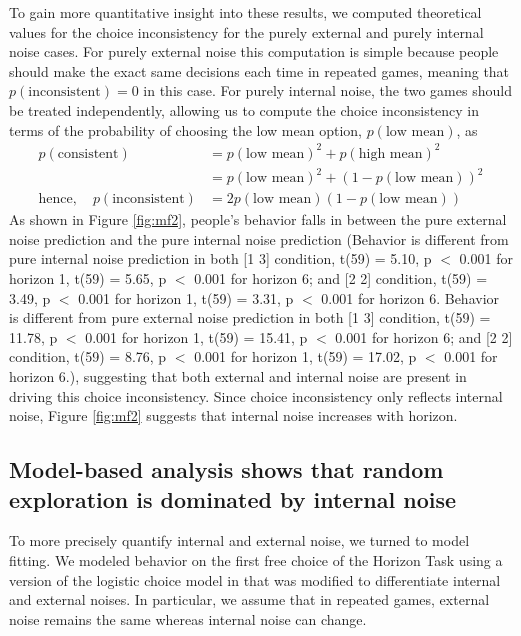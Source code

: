 \documentclass[12pt]{article}
\begin{document}
	To gain more quantitative insight into these results, we computed theoretical values for the choice inconsistency for the purely external and purely internal noise cases.  For purely external noise this computation is simple because people should make the exact same decisions each time in repeated games, meaning that $p(\mbox{inconsistent}) = 0$ in this case. For purely internal noise, the two games should be treated independently, allowing us to compute the choice inconsistency in terms of the probability of choosing the low mean option, $p(\mbox{low mean})$, as
	\begin{equation*}
	\begin{split}
	p(\mbox{consistent}) &= p(\mbox{low mean})^2 + p(\mbox{high mean})^2\\
	&= p(\mbox{low mean})^2 + (1-p(\mbox{low mean}))^2\\ 
	\mbox{hence},\quad p(\mbox{inconsistent}) &=  2 p(\mbox{low mean})(1-p(\mbox{low mean}))
	\end{split}
	\end{equation*}
	As shown in Figure  \ref{fig:mf2}, people's behavior falls in between the pure external noise prediction and the pure internal noise prediction (Behavior is different from pure internal noise prediction in both [1 3] condition, t(59) = 5.10, p $<$ 0.001 for horizon 1, t(59) = 5.65, p $<$ 0.001 for horizon 6; and [2 2] condition, t(59) = 3.49, p $<$ 0.001 for horizon 1, t(59) = 3.31, p $<$ 0.001 for horizon 6. Behavior is different from pure external noise prediction in both [1 3] condition, t(59) = 11.78, p $<$ 0.001 for horizon 1, t(59) = 15.41, p $<$ 0.001 for horizon 6; and [2 2] condition, t(59) = 8.76, p $<$ 0.001 for horizon 1, t(59) = 17.02, p $<$ 0.001 for horizon 6.), suggesting that both external and internal noise are present in driving this choice inconsistency. Since choice inconsistency only reflects internal noise, Figure \ref{fig:mf2} suggests that internal noise increases with horizon.
	
	\subsection*{Model-based analysis shows that random exploration is dominated by internal noise}
	
	To more precisely quantify internal and external noise, we turned to model fitting. We modeled behavior on the first free choice of the Horizon Task using a version of the logistic choice model in \citep{wilson2014} that was modified to differentiate internal and external noises. In particular, we assume that in repeated games, external noise remains the same whereas internal noise can change. 
	
\end{document}
